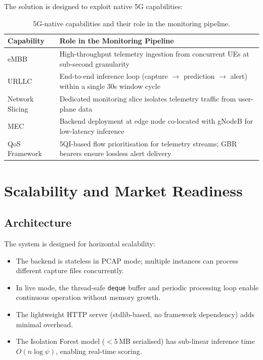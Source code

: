 \documentclass[11pt, a4paper]{article}
\begin{document}
The solution is designed to exploit native 5G capabilities:

\begin{table}[H]
\centering
\begin{tabular}{l p{9.8cm}}
\toprule
\textbf{Capability} & \textbf{Role in the Monitoring Pipeline} \\
\midrule
eMBB           & High-throughput telemetry ingestion from concurrent UEs at sub-second granularity \\
URLLC          & End-to-end inference loop (capture $\to$ prediction $\to$ alert) within a single 30s window cycle \\
Network Slicing & Dedicated monitoring slice isolates telemetry traffic from user-plane data \\
MEC            & Backend deployment at edge node co-located with gNodeB for low-latency inference \\
QoS Framework  & 5QI-based flow prioritisation for telemetry streams; GBR bearers ensure lossless alert delivery \\
\bottomrule
\end{tabular}
\caption{5G-native capabilities and their role in the monitoring pipeline.}
\label{tab:5gcap}
\end{table}

\section{Scalability and Market Readiness}

\subsection{Architecture}

The system is designed for horizontal scalability:

\begin{itemize}
    \item The backend is stateless in PCAP mode; multiple instances can process different capture files concurrently.
    \item In live mode, the thread-safe \texttt{deque} buffer and periodic processing loop enable continuous operation without memory growth.
    \item The lightweight HTTP server (stdlib-based, no framework dependency) adds minimal overhead.
    \item The Isolation Forest model ($<$5\,MB serialised) has sub-linear inference time $O(n \log \psi)$, enabling real-time scoring.
\end{itemize}
\end{document}
